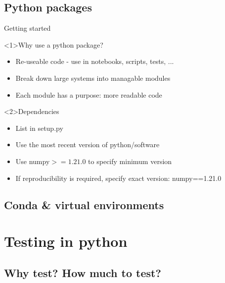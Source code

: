 \documentclass[t]{beamer}
\begin{document}
\subsection{Python packages}


\begin{frame}{Getting started}
    \begin{block}<1>{Why use a python package?}
        \begin{itemize}
            \item Re-useable code - use in notebooks, scripts, tests, ...
            \item Break down large systems into managable modules
            \item Each module has a purpose: more readable code
        \end{itemize}
    \end{block}

    \begin{block}<2>{Dependencies}
        \begin{itemize}
            \item List in setup.py
            \item Use the most recent version of python/software
            \item Use numpy$>=1.21.0$ to specify minimum version
            \item If reproducibility is required, specify exact version: numpy==1.21.0
        \end{itemize}
    \end{block}
\end{frame}

\subsection{Conda \& virtual environments}

\section{Testing in python}

\subsection{Why test? How much to test?}
\end{document}
